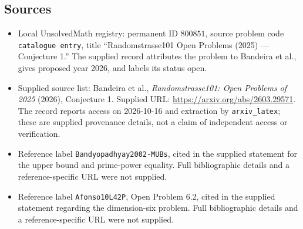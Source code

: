 \documentclass[11pt]{article}
\begin{document}
\subsection{Sources}
\begin{itemize}
\item Local UnsolvedMath registry: permanent ID \(800851\), source problem code \texttt{catalogue entry}, title ``Randomstrasse101 Open Problems (2025) --- Conjecture 1.'' The supplied record attributes the problem to Bandeira et al., gives proposed year 2026, and labels its status open.
\item Supplied source list: Bandeira et al., \emph{Randomstrasse101: Open Problems of 2025} (2026), Conjecture 1. Supplied URL: \url{https://arxiv.org/abs/2603.29571}. The record reports access on 2026-10-16 and extraction by \texttt{arxiv\_latex}; these are supplied provenance details, not a claim of independent access or verification.
\item Reference label \texttt{Bandyopadhyay2002-MUBs}, cited in the supplied statement for the upper bound and prime-power equality. Full bibliographic details and a reference-specific URL were not supplied.
\item Reference label \texttt{Afonso10L42P}, Open Problem 6.2, cited in the supplied statement regarding the dimension-six problem. Full bibliographic details and a reference-specific URL were not supplied.
\end{itemize}
\end{document}
